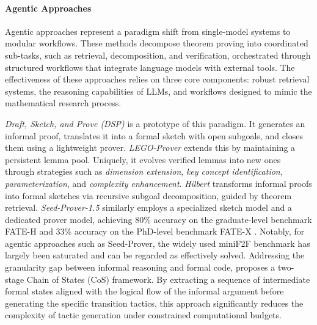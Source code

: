 \documentclass[11pt]{article}
\numberwithin{equation}{section}
\begin{document}
\paragraph{Agentic Approaches}
Agentic approaches \cite{jiang2023draft,wang2024legoprover,varambally2025hilbert,Chen_et_al_2025_Seed-Prover1.5,jiang2025fate,gloeckle2025reinforcement,achim2025aristotle} represent a paradigm shift from single-model systems to modular workflows. These methods decompose theorem proving into coordinated sub-tasks, such as retrieval, decomposition, and verification, orchestrated through structured workflows that integrate language models with external tools.  The effectiveness of these approaches relies on three core components: robust retrieval systems, the reasoning capabilities of LLMs, and workflows designed to mimic the mathematical research process.

\textit{Draft, Sketch, and Prove (DSP)} \cite{jiang2023draft} is a prototype of this paradigm. It generates an informal proof, translates it into a formal sketch with open subgoals, and closes them using a lightweight prover. \textit{LEGO-Prover} \cite{wang2024legoprover} extends this by maintaining a persistent lemma pool. Uniquely, it evolves verified lemmas into new ones through strategies such as \textit{dimension extension}, \textit{key concept identification}, \textit{parameterization}, and \textit{complexity enhancement}. \textit{Hilbert} \cite{varambally2025hilbert} transforms informal proofs into formal sketches via recursive subgoal decomposition, guided by theorem retrieval. \textit{Seed-Prover-1.5} \cite{Chen_et_al_2025_Seed-Prover1.5} similarly employs a specialized sketch model and a dedicated prover model, achieving 80\% accuracy on the graduate-level benchmark FATE-H and 33\% accuracy on the PhD-level benchmark FATE-X \cite{jiang2025fate}. Notably, for agentic approaches such as Seed-Prover, the widely used miniF2F benchmark \cite{zheng2021minif2f} has largely been saturated and can be regarded as effectively solved. Addressing the granularity gap between informal reasoning and formal code, \cite{wang2025translating} proposes a two-stage Chain of States (CoS) framework. By extracting a sequence of intermediate formal states aligned with the logical flow of the informal argument before generating the specific transition tactics, this approach significantly reduces the complexity of tactic generation under constrained computational budgets.
\end{document}
